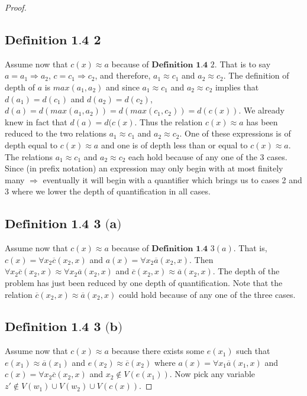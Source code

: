 \documentclass{article}
\theoremstyle{problemstyle}
\theoremstyle{lemmastyle}
\theoremstyle{theoremstyle}
\begin{document}
\begin{proof}
\subsection*{$\textbf{Definition 1.4}$ $\textbf{2}$} 
Assume now that $c(x) \approx a$ because of $\textbf{Definition 1.4}$ $2$. That is to say $a = a_1 \Rightarrow a_2$, $c = c_1 \Rightarrow c_2$, and therefore, $a_1 \approx c_1$ and $a_2 \approx c_2$. The definition of depth of $a$ is $max(a_1, a_2)$ and since  $a_1 \approx c_1$ and $a_2 \approx c_2$ implies that $d(a_1) = d(c_1)$ and $d(a_2) = d(c_2)$, $d(a) = d(max(a_1, a_2)) = d(max(c_1, c_2)) = d(c(x))$. We already knew in fact that $d(a) = d(c(x)$. Thus the relation $c(x) \approx a$ has been reduced to the two relations $a_1 \approx c_1$ and $a_2 \approx c_2$. One of these expressions is of depth equal to $c(x) \approx a$ and one is of depth less than or equal to $c(x) \approx a$.  The relations $a_1 \approx c_1$ and $a_2 \approx c_2$ each hold because of any one of the $3$ cases. Since (in prefix notation) an expression may only begin with at most finitely many $\Rightarrow$ eventually it will begin with a quantifier which brings us to cases 2 and 3 where we lower the depth of quantification in all cases. 

\subsection*{$\textbf{Definition 1.4}$ $\textbf{3 (a)}$} 
Assume now that $c(x) \approx a$ because of $\textbf{Definition 1.4}$ $3 (a)$. That is, $c(x) = \forall x_2\overline{c}(x_2,x)$ and $a(x) = \forall x_2\overline{a}(x_2,x)$. Then $\forall x_2\overline{c}(x_2,x) \approx \forall x_2\overline{a}(x_2,x)$ and $\overline{c}(x_2,x) \approx \overline{a}(x_2,x)$. The depth of the problem has just been reduced by one depth of quantification. Note that the relation $\overline{c}(x_2,x) \approx \overline{a}(x_2,x)$ could hold because of any one of the three cases. 

\subsection*{$\textbf{Definition 1.4}$ $\textbf{3 (b)}$} 
Assume now that $c(x) \approx a$ because there exists some $e(x_1)$ such that $e(x_1) \approx \overline{a}(x_1)$ and $e(x_2) \approx \overline{c}(x_2)$ where $a(x) = \forall x_1 \overline{a}(x_1,x)$ and $c(x) = \forall x_2 \overline{c}(x_2,x)$ and $x_2 \notin V(e(x_1))$. Now pick any variable $z' \notin V(w_1) \cup V(w_2)\cup V(c(x))$.  


\end{proof}
\end{document}
